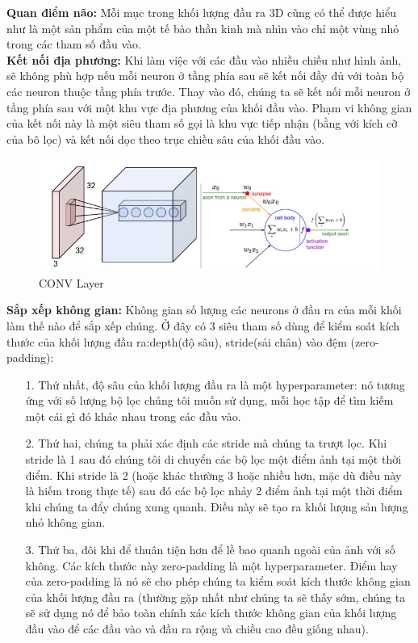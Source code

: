 \documentclass[a4paper,12pt]{report}
\begin{document}
\textbf{Quan điểm não:}  Mỗi mục trong khối lượng đầu ra 3D cũng có thể được hiểu như là một sản phẩm của một tế bào thần kinh mà nhìn vào chỉ một vùng nhỏ trong các tham số đầu vào. \\ 
 
\textbf{Kết nối địa phương:} Khi làm việc với các đầu vào nhiều chiều như hình ảnh, sẽ không phù hợp nếu mỗi neuron ở tầng phía sau sẽ kết nối đầy đủ với toàn bộ các neuron thuộc tầng phía trước. Thay vào đó, chúng ta sẽ kết nối mỗi neuron ở tầng phía sau với một khu vực địa phương của khối đầu vào. Phạm vi không gian của kết nối này là một siêu tham số gọi là khu vực tiếp nhận (bằng với kích cỡ của bô lọc) và kết nối dọc theo trục chiều sâu của khối đầu vào.
\begin{figure}[H]
\includegraphics[scale=0.7]{img2.png}
\caption{CONV Layer}
\end{figure}
\textbf{Sắp xếp không gian:} Không gian số lượng các neurons ở đầu ra của mỗi khối làm thế nào để sắp xếp chúng. Ở đây có 3 siêu tham số dùng để kiểm soát kích thước của khối lượng đầu ra:depth(độ sâu), stride(sải chân) vào đệm (zero-padding):
\begin{itemize}
\item[1. ] Thứ nhất, độ sâu của khối lượng đầu ra là một hyperparameter: nó tương ứng với số lượng bộ lọc chúng tôi muốn sử dụng, mỗi học tập để tìm kiếm một cái gì đó khác nhau trong các đầu vào.
\item[2. ] Thứ hai, chúng ta phải xác định các stride mà chúng ta trượt lọc. Khi stride là 1 sau đó chúng tôi di chuyển các bộ lọc một điểm ảnh tại một thời điểm. Khi stride là 2 (hoặc khác thường 3 hoặc nhiều hơn, mặc dù điều này là hiếm trong thực tế) sau đó các bộ lọc nhảy 2 điểm ảnh tại một thời điểm khi chúng ta đẩy chúng xung quanh. Điều này sẽ tạo ra khối lượng sản lượng nhỏ không gian.
\item[3. ] Thứ ba, đôi khi để thuân tiện hơn để lề bao quanh ngoài của ảnh với số không. Các kích thước này zero-padding là một hyperparameter. Điểm hay của zero-padding là nó sẽ cho phép chúng ta kiểm soát kích thước không gian của khối lượng đầu ra (thường gặp nhất như chúng ta sẽ thấy sớm, chúng ta sẽ sử dụng nó để bảo toàn chính xác kích thước không gian của khối lượng đầu vào để các đầu vào và đầu ra rộng và chiều cao đều giống nhau).
\end{itemize} 
\end{document}

